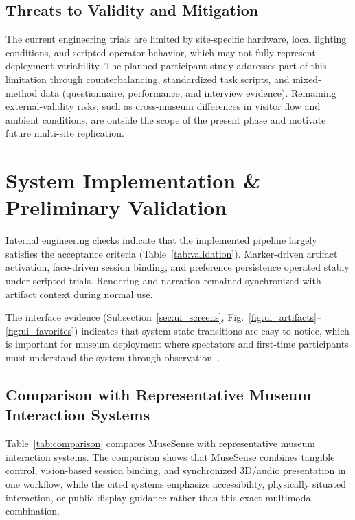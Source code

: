 \documentclass[conference]{IEEEtran}
\begin{document}
\subsection{Threats to Validity and Mitigation}
The current engineering trials are limited by site-specific hardware, local lighting conditions, and scripted operator behavior, which may not fully represent deployment variability. The planned participant study addresses part of this limitation through counterbalancing, standardized task scripts, and mixed-method data (questionnaire, performance, and interview evidence). Remaining external-validity risks, such as cross-museum differences in visitor flow and ambient conditions, are outside the scope of the present phase and motivate future multi-site replication.

\section{System Implementation \& Preliminary Validation}
Internal engineering checks indicate that the implemented pipeline largely satisfies the acceptance criteria (Table~\ref{tab:validation}). Marker-driven artifact activation, face-driven session binding, and preference persistence operated stably under scripted trials. Rendering and narration remained synchronized with artifact context during normal use.

The interface evidence (Subsection~\ref{sec:ui_screens}, Fig.~\ref{fig:ui_artifacts}--\ref{fig:ui_favorites}) indicates that system state transitions are easy to notice, which is important for museum deployment where spectators and first-time participants must understand the system through observation~\cite{reeves2005,brignull2003}.

\subsection{Comparison with Representative Museum Interaction Systems}
Table~\ref{tab:comparison} compares MuseSense with representative museum interaction systems. The comparison shows that MuseSense combines tangible control, vision-based session binding, and synchronized 3D/audio presentation in one workflow, while the cited systems emphasize accessibility, physically situated interaction, or public-display guidance rather than this exact multimodal combination.
\end{document}
